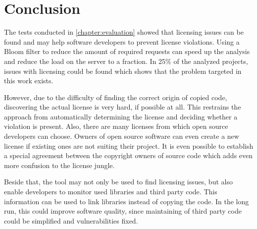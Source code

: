 
\chapter{Conclusion}\label{chapter:conclusion}
The tests conducted in \autoref{chapter:evaluation} showed that licensing issues can be found and may help software developers to prevent license violations.
Using a Bloom filter to reduce the amount of required requests can speed up the analysis and reduce the load on the server to a fraction.
In 25\% of the analyzed projects, issues with licensing could be found which shows that the problem targeted in this work exists.

However, due to the difficulty of finding the correct origin of copied code, discovering the actual license is very hard, if possible at all.
This restrains the approach from automatically determining the license and deciding whether a violation is present.
Also, there are many licenses from which open source developers can choose.
Owners of open source software can even create a new license if existing ones are not suiting their project.
It is even possible to establish a special agreement between the copyright owners of source code which adds even more confusion to the license jungle.

Beside that, the tool may not only be used to find licensing issues, but also enable developers to monitor used libraries and third party code.
This information can be used to link libraries instead of copying the code.
In the long run, this could improve software quality, since maintaining of third party code could be simplified and vulnerabilities fixed.
